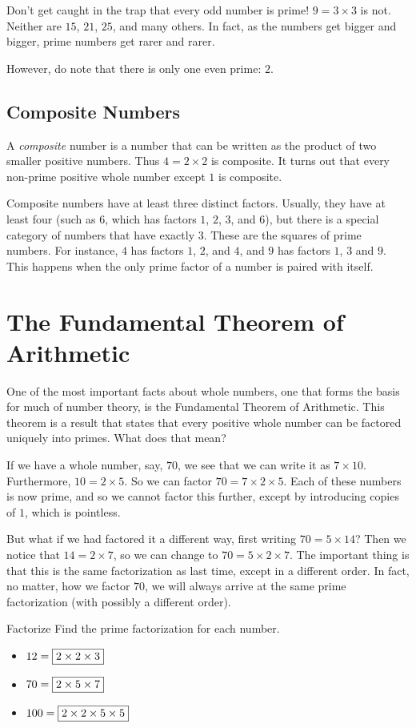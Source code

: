 \documentclass[a4paper,10pt]{report}
\begin{document}
Don't get caught in the trap that every odd number is prime! $9=3\times3$ is
not. Neither are $15$, $21$, $25$, and many others. In fact, as the numbers get
bigger and bigger, prime numbers get rarer and rarer.

However, do note that there is only one even prime: $2$.

\subsection{Composite Numbers}
A \emph{composite} number is a number that can be written as the product of two
smaller positive numbers. Thus $4=2\times2$ is composite. It turns out that
every non-prime positive whole number except $1$ is composite.

Composite numbers have at least three distinct factors. Usually, they have at
least four (such as $6$, which has factors $1$, $2$, $3$, and $6$), but there is
a special category of numbers that have exactly $3$. These are the squares of
prime numbers. For instance, $4$ has factors $1$, $2$, and $4$, and $9$ has
factors $1$, $3$ and $9$. This happens when the only prime factor of a number is
paired with itself.

\section{The Fundamental Theorem of Arithmetic}

One of the most important facts about whole numbers, one that forms the basis
for much of number theory, is the Fundamental Theorem of Arithmetic. This
theorem is a result that states that every positive whole number can be factored
uniquely into primes. What does that mean?

If we have a whole number, say, $70$, we see that we can write it as
$7\times10$. Furthermore, $10=2\times5$. So we can factor $70=7\times2\times5$.
Each of these numbers is now prime, and so we cannot factor this further, except
by introducing copies of $1$, which is pointless.

But what if we had factored it a different way, first writing $70=5\times14$?
Then we notice that $14=2\times7$, so we can change to $70=5\times2\times7$. The
important thing is that this is the same factorization as last time, except in a
different order. In fact, no matter, how we factor $70$, we will always arrive
at the same prime factorization (with possibly a different order).

\begin{problem}{Factorize}
 Find the prime factorization for each number.

 \begin{itemize}
  \item $12 = \Ans{2\times2\times3}$
  \item $70 = \Ans{2\times5\times7}$
  \item $100 = \Ans{2\times2\times5\times5}$
 \end{itemize}
\end{problem}
\end{document}
